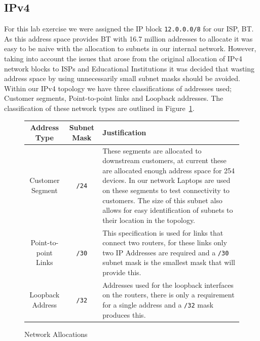 \subsection{IPv4}
For this lab exercise we were assigned the IP block \texttt{12.0.0.0/8} for our ISP, BT.
As this address space provides BT with 16.7 million addresses to allocate it was
easy to be naive with the allocation to subnets in our internal network.
However, taking into account the issues that arose from the original allocation
of IPv4 network blocks to ISPs and Educational Institutions it was decided that
wasting address space by using unnecessarily small subnet masks should be
avoided. Within our IPv4 topology we have three classifications of addresses
used; Customer segments, Point-to-point links and Loopback addresses. The
classification of these network types are outlined in
Figure~\ref{figure:network-alloc-1}.

\begin{figure}[!ht]
    \caption{Network Allocations}
    \label{figure:network-alloc-1}
    \centering
    \begin{tabular}{|c|c|p{5.5cm}|}

        \hline
        \textbf{Address Type} & \textbf{Subnet Mask} & \textbf{Justification} \\

        \hline
        Customer Segment & \texttt{/24} & These segments are allocated to downstream
        customers, at current these are allocated enough address space for 254
        devices. In our network Laptops are used on these segments to test
        connectivity to customers. The size of this subnet also allows for easy
        identification of subnets to their location in the topology.\\

        \hline
        Point-to-point Links & \texttt{/30} & This specification is used for links that
        connect two routers, for these links only two IP Addresses are required
        and a \texttt{/30} subnet mask is the smallest mask that will provide this.\\

        \hline
        Loopback Address & \texttt{/32} & Addresses used for the loopback interfaces on
        the routers, there is only a requirement for a single address and a \texttt{/32}
        mask produces this.\\

        \hline
    \end{tabular}
\end{figure}

